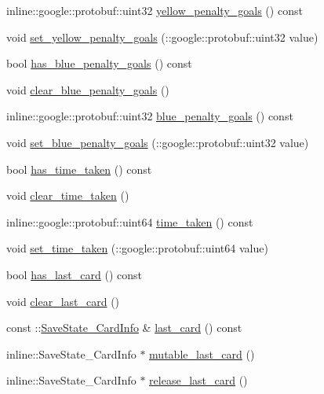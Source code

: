 \begin{DoxyCompactItemize}
\item 
inline\-::google\-::protobuf\-::uint32 \hyperlink{class_save_state_a66ffa17af359d2aae1d05a721c610ca0}{yellow\-\_\-penalty\-\_\-goals} () const 
\item 
void \hyperlink{class_save_state_a378be2ec48d97fc07b58348df625e267}{set\-\_\-yellow\-\_\-penalty\-\_\-goals} (\-::google\-::protobuf\-::uint32 value)
\item 
bool \hyperlink{class_save_state_a93bd6c777b8727df0bc2c6644986c74a}{has\-\_\-blue\-\_\-penalty\-\_\-goals} () const 
\item 
void \hyperlink{class_save_state_a63c1caab5c01764eda67e07e9a558954}{clear\-\_\-blue\-\_\-penalty\-\_\-goals} ()
\item 
inline\-::google\-::protobuf\-::uint32 \hyperlink{class_save_state_a6f158917a5aa97a597539082e42c9712}{blue\-\_\-penalty\-\_\-goals} () const 
\item 
void \hyperlink{class_save_state_a9a36e57ccee286e765ba7de290372d25}{set\-\_\-blue\-\_\-penalty\-\_\-goals} (\-::google\-::protobuf\-::uint32 value)
\item 
bool \hyperlink{class_save_state_aad0fa1f08db409c58a3b1a552d783f50}{has\-\_\-time\-\_\-taken} () const 
\item 
void \hyperlink{class_save_state_aab9cc81f41180f7e8550916c1f35dcc4}{clear\-\_\-time\-\_\-taken} ()
\item 
inline\-::google\-::protobuf\-::uint64 \hyperlink{class_save_state_a11a9ffe06a6af239c70e55a98862abe2}{time\-\_\-taken} () const 
\item 
void \hyperlink{class_save_state_a8420dceba818ea205eede67971c0724c}{set\-\_\-time\-\_\-taken} (\-::google\-::protobuf\-::uint64 value)
\item 
bool \hyperlink{class_save_state_adbd946e1d329a5a8ed95470ca3a84e1a}{has\-\_\-last\-\_\-card} () const 
\item 
void \hyperlink{class_save_state_aba260bc230179749b013fdb8e77b72cc}{clear\-\_\-last\-\_\-card} ()
\item 
const \-::\hyperlink{class_save_state___card_info}{Save\-State\-\_\-\-Card\-Info} \& \hyperlink{class_save_state_a5e8a964aec9672579514bea0b88ea9e1}{last\-\_\-card} () const 
\item 
inline\-::\-Save\-State\-\_\-\-Card\-Info $\ast$ \hyperlink{class_save_state_acaac51e35b24d0185b1767b5a64a6a03}{mutable\-\_\-last\-\_\-card} ()
\item 
inline\-::\-Save\-State\-\_\-\-Card\-Info $\ast$ \hyperlink{class_save_state_ae00998ec01794d8f24767571fbe573c7}{release\-\_\-last\-\_\-card} ()

\end{DoxyCompactItemize}
